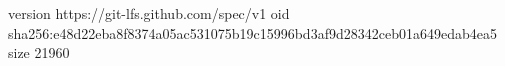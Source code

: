 version https://git-lfs.github.com/spec/v1
oid sha256:e48d22eba8f8374a05ac531075b19c15996bd3af9d28342ceb01a649edab4ea5
size 21960
